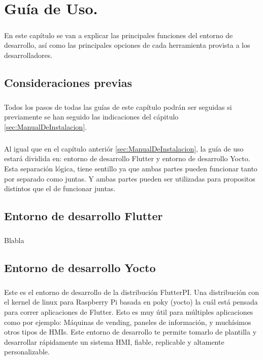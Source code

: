 \chapter{Guía de Uso.}\label{sec:GuiaDeUso}

\paragraph{}En este capítulo se van a explicar las principales funciones del entorno de
desarrollo, así como las principales opciones de cada herramienta provista a los
desarrolladores.

\section{Consideraciones previas}

\paragraph{}Todos los pasos de todas las guías de este capítulo podrán ser seguidas si
previamente se han seguido las indicaciones del cápitulo \ref{sec:ManualDeInstalacion}.

\paragraph{}Al igual que en el capítulo anteriór \ref{sec:ManualDeInstalacion}, la guía
de uso estará dividida en: entorno de desarrollo Flutter y entorno de desarrollo Yocto.
Esta separación lógica, tiene sentillo ya que ambas partes pueden funcionar tanto por
separado como juntas. Y ambas partes pueden ser utilizadas para propositos distintos
que el de funcionar juntas.

\section{Entorno de desarrollo Flutter}

\paragraph{}Blabla


\section{Entorno de desarrollo Yocto}

\paragraph{}Este es el entorno de desarrollo de la distribución FlutterPI. Una distribución
con el kernel de linux para Raspberry Pi basada en poky (yocto) la cuál está pensada
para correr aplicaciones de Flutter. Esto es muy útil para múltiples aplicaciones como
por ejemplo: Máquinas de vending, paneles de información, y muchísimos otros tipos de
HMIs. Este entorno de desarrollo te permite tomarlo de plantilla y desarrollar rápidamente
un sistema HMI, fiable, replicable y altamente personalizable.

